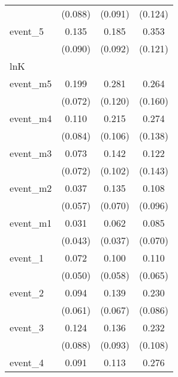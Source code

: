 {\begin{tabular}{l*{3}{c}}
            &     (0.088)         &     (0.091)         &     (0.124)         \\
[1em]
event\_5     &       0.135         &       0.185\sym{*}  &       0.353\sym{**} \\
            &     (0.090)         &     (0.092)         &     (0.121)         \\
\hline
lnK         &                     &                     &                     \\
event\_m5    &       0.199\sym{**} &       0.281\sym{*}  &       0.264         \\
            &     (0.072)         &     (0.120)         &     (0.160)         \\
[1em]
event\_m4    &       0.110         &       0.215\sym{*}  &       0.274\sym{*}  \\
            &     (0.084)         &     (0.106)         &     (0.138)         \\
[1em]
event\_m3    &       0.073         &       0.142         &       0.122         \\
            &     (0.072)         &     (0.102)         &     (0.143)         \\
[1em]
event\_m2    &       0.037         &       0.135         &       0.108         \\
            &     (0.057)         &     (0.070)         &     (0.096)         \\
[1em]
event\_m1    &       0.031         &       0.062         &       0.085         \\
            &     (0.043)         &     (0.037)         &     (0.070)         \\
[1em]
event\_1     &       0.072         &       0.100         &       0.110         \\
            &     (0.050)         &     (0.058)         &     (0.065)         \\
[1em]
event\_2     &       0.094         &       0.139\sym{*}  &       0.230\sym{**} \\
            &     (0.061)         &     (0.067)         &     (0.086)         \\
[1em]
event\_3     &       0.124         &       0.136         &       0.232\sym{*}  \\
            &     (0.088)         &     (0.093)         &     (0.108)         \\
[1em]
event\_4     &       0.091         &       0.113         &       0.276\sym{*}  \\

\end{tabular}}
